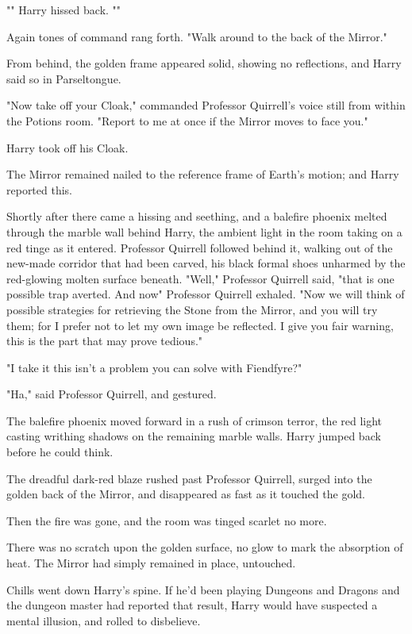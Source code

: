 "" Harry hissed back. ""

Again tones of command rang forth. "Walk around to the back of the Mirror."

From behind, the golden frame appeared solid, showing no reflections, and Harry
said so in Parseltongue.

"Now take off your Cloak," commanded Professor Quirrell's voice still from
within the Potions room. "Report to me at once if the Mirror moves to face you."

Harry took off his Cloak.

The Mirror remained nailed to the reference frame of Earth's motion; and Harry
reported this.

Shortly after there came a hissing and seething, and a balefire phoenix melted
through the marble wall behind Harry, the ambient light in the room taking on a
red tinge as it entered. Professor Quirrell followed behind it, walking out of
the new-made corridor that had been carved, his black formal shoes unharmed by
the red-glowing molten surface beneath. "Well," Professor Quirrell said, "that
is one possible trap averted. And now{\el}" Professor Quirrell exhaled. "Now
we will think of possible strategies for retrieving the Stone from the Mirror,
and you will try them; for I prefer not to let my own image be reflected. I
give you fair warning, this is the part that may prove tedious."

"I take it this isn't a problem you can solve with Fiendfyre?"

"Ha," said Professor Quirrell, and gestured.

The balefire phoenix moved forward in a rush of crimson terror, the red light
casting writhing shadows on the remaining marble walls. Harry jumped back
before he could think.

The dreadful dark-red blaze rushed past Professor Quirrell, surged into the
golden back of the Mirror, and disappeared as fast as it touched the gold.

Then the fire was gone, and the room was tinged scarlet no more.

There was no scratch upon the golden surface, no glow to mark the absorption of
heat. The Mirror had simply remained in place, untouched.

Chills went down Harry's spine. If he'd been playing Dungeons and Dragons and
the dungeon master had reported that result, Harry would have suspected a
mental illusion, and rolled to disbelieve.

